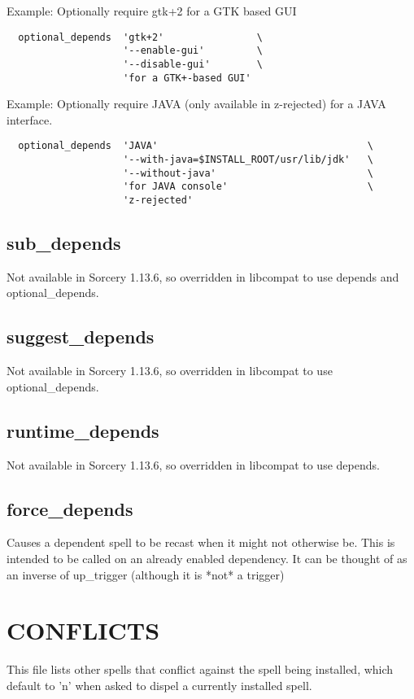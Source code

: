 \documentclass[a4paper,10pt]{book}
\begin{document}
Example: Optionally require gtk+2 for a GTK based GUI
\begin{verbatim}
  optional_depends  'gtk+2'                \
                    '--enable-gui'         \
                    '--disable-gui'        \
                    'for a GTK+-based GUI'
\end{verbatim}

Example: Optionally require JAVA (only available in z-rejected) for a JAVA
interface.
\begin{verbatim}
  optional_depends  'JAVA'                                    \
                    '--with-java=$INSTALL_ROOT/usr/lib/jdk'   \
                    '--without-java'                          \
                    'for JAVA console'                        \
                    'z-rejected'
\end{verbatim}


\subsection{sub\_depends}
Not available in Sorcery 1.13.6, so overridden in libcompat to use depends and
optional\_depends.

\subsection{suggest\_depends}
Not available in Sorcery 1.13.6, so overridden in libcompat to use
optional\_depends.

\subsection{runtime\_depends}
Not available in Sorcery 1.13.6, so overridden in libcompat to use
depends.

\subsection{force\_depends}
Causes a dependent spell to be recast when it might not otherwise be. This is
intended to be called on an already enabled dependency. It can be thought of
as an inverse of up\_trigger (although it is *not* a trigger)

\section{CONFLICTS}
This file lists other spells that conflict against the spell being installed,
which default to 'n' when asked to dispel a currently installed spell.
\end{document}
